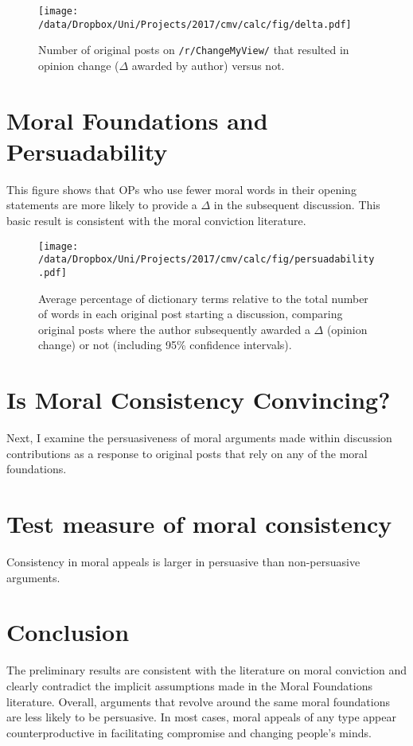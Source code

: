 \begin{figure}
\centering
\texttt{[image: /data/Dropbox/Uni/Projects/2017/cmv/calc/fig/delta.pdf]}
\caption{Number of original posts on \texttt{/r/ChangeMyView/} that resulted in opinion change ($\Delta$ awarded by author) versus not.}
\end{figure}


\section{Moral Foundations and Persuadability}\label{moral-foundations-and-persuadability}

This figure shows that OPs who use fewer moral words in their opening statements are more likely to provide a \(\Delta\) in the subsequent discussion. This basic result is consistent with the moral conviction literature.

\begin{figure}
\centering
\texttt{[image: /data/Dropbox/Uni/Projects/2017/cmv/calc/fig/persuadability.pdf]}
\caption{Average percentage of dictionary terms relative to the total number of words in each original post starting a discussion, comparing original posts where the author subsequently awarded a $\Delta$ (opinion change) or not (including 95\% confidence intervals).}
\end{figure}

\section{Is Moral Consistency
Convincing?}\label{is-moral-consistency-convincing}

Next, I examine the persuasiveness of moral arguments made within discussion contributions as a response to original posts that rely on any of the moral foundations.


\section{Test measure of moral consistency}\label{test-measure-of-moral-consistency}


Consistency in moral appeals is larger in persuasive than non-persuasive arguments.

\section{Conclusion}\label{conclusion}

The preliminary results are consistent with the literature on moral conviction and clearly contradict the implicit assumptions made in the Moral Foundations literature. Overall, arguments that revolve around the same moral foundations are less likely to be persuasive. In most cases, moral appeals of any type appear counterproductive in facilitating compromise and changing people's minds.


